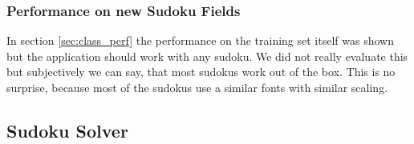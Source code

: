 \documentclass[
a4paper,     %
12pt         %
]{scrartcl}  %
\begin{document}
\subsubsection{Performance on new Sudoku Fields}

In section \ref{sec:class_perf} the performance on the training set itself was shown but the application
should work with any sudoku. We did not really evaluate this but subjectively we can say, that most
sudokus work out of the box. This is no surprise, because most of the sudokus use a similar fonts with
similar scaling.

\subsection{Sudoku Solver}
\label{imp_sudoku_solver}
\end{document}
